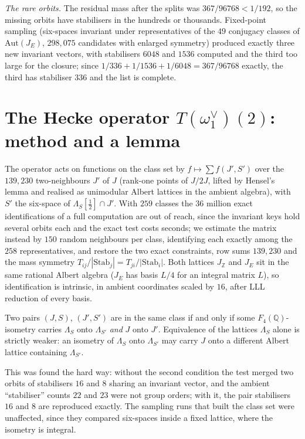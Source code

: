 \documentclass[11pt]{article}
\theoremstyle{definition}\newtheorem{computation}[theorem]{Computation}\newtheorem{remark}[theorem]{Remark}\newtheorem{prediction}[theorem]{Prediction}
\newcommand{\Z}{\mathbb Z}\newcommand{\Q}{\mathbb Q}\newcommand{\F}{\mathbb F}\newcommand{\Ff}{F_4}\newcommand{\Aut}{\mathrm{Aut}}\newcommand{\Stab}{\mathrm{Stab}}
\begin{document}
\emph{The rare orbits.} The residual mass after the splits was $367/96768<1/192$, so the missing orbits have stabilisers in the hundreds or thousands. Fixed-point sampling (six-spaces invariant under representatives of the $49$ conjugacy classes of $\Aut(J_E)$, $298{,}075$ candidates with enlarged symmetry) produced exactly three new invariant vectors, with stabilisers $6048$ and $1536$ computed and the third too large for the closure; since $1/336+1/1536+1/6048=367/96768$ exactly, the third has stabiliser $336$ and the list is complete.

\section{The Hecke operator $T(\omega_1^\vee)(2)$: method and a lemma}
The operator acts on functions on the class set by $f\mapsto\sum f(J',S')$ over the $139{,}230$ two-neighbours $J'$ of $J$ (rank-one points of $J/2J$, lifted by Hensel's lemma and realised as unimodular Albert lattices in the ambient algebra), with $S'$ the six-space of $\Lambda_S[\tfrac12]\cap J'$. With $259$ classes the $36$ million exact identifications of a full computation are out of reach, since the invariant keys hold several orbits each and the exact test costs seconds; we estimate the matrix instead by $150$ random neighbours per class, identifying each exactly among the $258$ representatives, and restore the two exact constraints, row sums $139{,}230$ and the mass symmetry $T_{ij}/|\Stab_j|=T_{ji}/|\Stab_i|$. Both lattices $J_\Z$ and $J_E$ sit in the same rational Albert algebra ($J_E$ has basis $L/4$ for an integral matrix $L$), so identification is intrinsic, in ambient coordinates scaled by $16$, after LLL reduction of every basis.
\begin{lemma}\label{lem:pair}
Two pairs $(J,S)$, $(J',S')$ are in the same class if and only if some $\Ff(\Q)$-isometry carries $\Lambda_S$ onto $\Lambda_{S'}$ \emph{and} $J$ onto $J'$. Equivalence of the lattices $\Lambda_S$ alone is strictly weaker: an isometry of $\Lambda_S$ onto $\Lambda_{S'}$ may carry $J$ onto a different Albert lattice containing $\Lambda_{S'}$.
\end{lemma}
This was found the hard way: without the second condition the test merged two orbits of stabilisers $16$ and $8$ sharing an invariant vector, and the ambient ``stabiliser'' counts $22$ and $23$ were not group orders; with it, the pair stabilisers $16$ and $8$ are reproduced exactly. The sampling runs that built the class set were unaffected, since they compared six-spaces inside a fixed lattice, where the isometry is integral.
\end{document}
